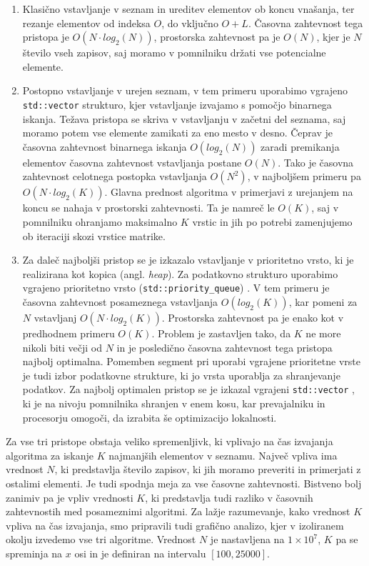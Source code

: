 \documentclass[a4paper,12pt,openright]{book}
\begin{document}
        \begin{enumerate}
            \item Klasično vstavljanje v seznam in ureditev elementov ob koncu vnašanja, ter rezanje elementov od indeksa $O$, do vključno $O+L$. Časovna zahtevnost tega pristopa je $O(N \cdot log_2(N))$, prostorska zahtevnost pa je $O(N)$, kjer je $N$ število vseh zapisov, saj moramo v pomnilniku držati vse potencialne elemente.
            \item Postopno vstavljanje v urejen seznam, v tem primeru uporabimo vgrajeno {\tt std::vector} \cite{CPP_VECTOR} strukturo, kjer vstavljanje izvajamo s pomočjo binarnega iskanja. Težava pristopa se skriva v vstavljanju v začetni del seznama, saj moramo potem vse elemente zamikati za eno mesto v desno. Čeprav je časovna zahtevnost binarnega iskanja $O(log_2(N))$ zaradi premikanja elementov časovna zahtevnost vstavljanja postane $O(N)$. Tako je časovna zahtevnost celotnega postopka vstavljanja $O(N^2)$, v najboljšem primeru pa $O(N \cdot log_2(K))$. Glavna prednost algoritma v primerjavi z urejanjem na koncu se nahaja v prostorski zahtevnosti. Ta je namreč le $O(K)$, saj v pomnilniku ohranjamo maksimalno $K$ vrstic in jih po potrebi zamenjujemo ob iteraciji skozi vrstice matrike.
            \item Za daleč najboljši pristop se je izkazalo vstavljanje v prioritetno vrsto, ki je realizirana kot kopica (angl. \textit{heap}). Za podatkovno strukturo uporabimo vgrajeno prioritetno vrsto ({\tt std::priority\_queue}) \cite{CPP_PQUEUE}. V tem primeru je časovna zahtevnost posameznega vstavljanja $O(log_2(K))$, kar pomeni za $N$ vstavljanj $O(N \cdot log_2(K))$. Prostorska zahtevnost pa je enako kot v predhodnem primeru $O(K)$. Problem je zastavljen tako, da $K$ ne more nikoli biti večji od $N$ in je posledično časovna zahtevnost tega pristopa najbolj optimalna. Pomemben segment pri uporabi vgrajene prioritetne vrste je tudi izbor podatkovne strukture, ki jo vrsta uporablja za shranjevanje podatkov. Za najbolj optimalen pristop se je izkazal vgrajeni {\tt std::vector} \cite{CPP_VECTOR}, ki je na nivoju pomnilnika shranjen v enem kosu, kar prevajalniku in procesorju omogoči, da izrabita še optimizacijo lokalnosti.
        \end{enumerate}

        \noindent
        Za vse tri pristope obstaja veliko spremenljivk, ki vplivajo na čas izvajanja algoritma za iskanje $K$ najmanjših elementov v seznamu. Največ vpliva ima vrednost $N$, ki predstavlja število zapisov, ki jih moramo preveriti in primerjati z ostalimi elementi. Je tudi spodnja meja za vse časovne zahtevnosti. Bistveno bolj zanimiv pa je vpliv vrednosti $K$, ki predstavlja tudi razliko v časovnih zahtevnostih med posameznimi algoritmi. Za lažje razumevanje, kako vrednost $K$ vpliva na čas izvajanja, smo pripravili tudi grafično analizo, kjer v izoliranem okolju izvedemo vse tri algoritme. Vrednost $N$ je nastavljena na $1 \times 10^7$, $K$ pa se spreminja na $x$ osi in je definiran na intervalu $[100, 25000]$.
\end{document}
